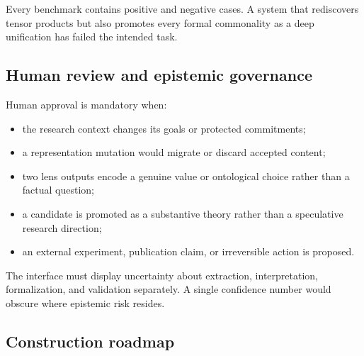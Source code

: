 \documentclass[11pt]{article}
\begin{document}
Every benchmark contains positive and negative cases. A system that rediscovers tensor products but
also promotes every formal commonality as a deep unification has failed the intended task.

\subsection{Human review and epistemic governance}

Human approval is mandatory when:
\begin{itemize}
  \item the research context changes its goals or protected commitments;
  \item a representation mutation would migrate or discard accepted content;
  \item two lens outputs encode a genuine value or ontological choice rather than a factual question;
  \item a candidate is promoted as a substantive theory rather than a speculative research direction;
  \item an external experiment, publication claim, or irreversible action is proposed.
\end{itemize}

The interface must display uncertainty about extraction, interpretation, formalization, and validation
separately. A single confidence number would obscure where epistemic risk resides.

\subsection{Construction roadmap}
\end{document}
